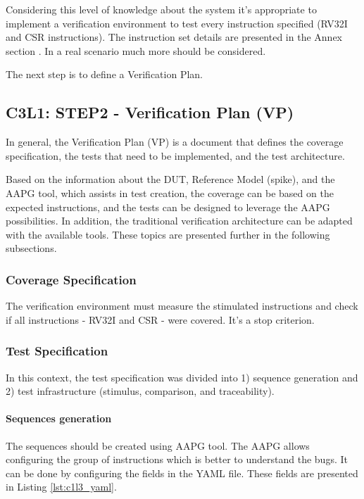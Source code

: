 Considering this level of knowledge about the system it's appropriate to implement a verification environment to test every instruction specified (RV32I and CSR instructions). The instruction set details are presented in the Annex section \cite{riscv_isa_vol1}. In a real scenario much more should be considered.

The next step is to define a Verification Plan.

\subsection{C3L1: STEP2 - Verification Plan (VP)}

In general, the Verification Plan (VP) is a document that defines the coverage specification, the tests that need to be implemented, and the test architecture.

Based on the information about the DUT, Reference Model (spike), and the AAPG tool, which assists in test creation, the coverage can be based on the expected instructions, and the tests can be designed to leverage the AAPG possibilities. In addition, the traditional verification architecture can be adapted with the available tools. These topics are presented further in the following subsections.

\subsubsection{Coverage Specification}

The verification environment must measure the stimulated instructions and check if all instructions - RV32I and CSR - were covered. It's a stop criterion.

\subsubsection{Test Specification}

In this context, the test specification was divided into 1) sequence generation and 2) test infrastructure (stimulus, comparison, and traceability). 

\paragraph{Sequences generation}

The sequences should be created using AAPG tool. The AAPG allows configuring the group of instructions which is better to understand the bugs. It can be done by configuring the fields in the YAML file. These fields are presented in Listing \ref{lst:c1l3_yaml}. 

